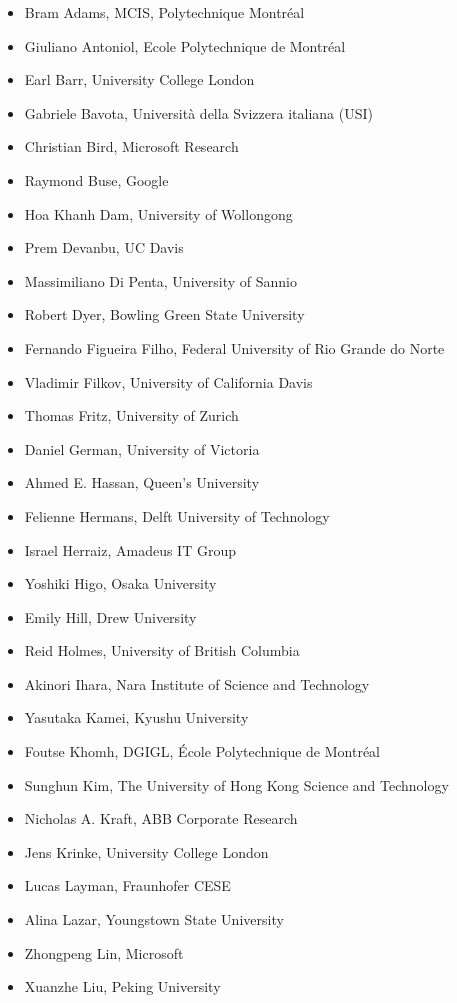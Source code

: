 \documentclass[a4paper]{report}
\begin{document}
\begin{itemize}
\item Bram Adams, MCIS, Polytechnique Montréal
\item Giuliano Antoniol, Ecole Polytechnique de Montréal
\item Earl Barr, University College London
\item Gabriele Bavota, Università della Svizzera italiana (USI)
\item Christian Bird, Microsoft Research
\item Raymond Buse, Google
\item Hoa Khanh Dam, University of Wollongong
\item Prem Devanbu, UC Davis
\item Massimiliano Di Penta, University of Sannio
\item Robert Dyer, Bowling Green State University
\item Fernando Figueira Filho, Federal University of Rio Grande do Norte
\item Vladimir Filkov, University of California Davis
\item Thomas Fritz, University of Zurich
\item Daniel German, University of Victoria
\item Ahmed E. Hassan, Queen's University
\item Felienne Hermans, Delft University of Technology
\item Israel Herraiz, Amadeus IT Group
\item Yoshiki    Higo, Osaka University
\item Emily Hill, Drew University
\item Reid Holmes, University of British Columbia
\item Akinori    Ihara, Nara Institute of Science and Technology
\item Yasutaka Kamei, Kyushu University
\item Foutse Khomh, DGIGL, École Polytechnique de Montréal
\item Sunghun  Kim, The University of Hong Kong Science and Technology
\item Nicholas A. Kraft, ABB Corporate Research
\item Jens Krinke, University College London
\item Lucas Layman, Fraunhofer CESE
\item Alina Lazar, Youngstown State University
\item Zhongpeng  Lin, Microsoft
\item Xuanzhe    Liu, Peking University

\end{itemize}
\end{document}
